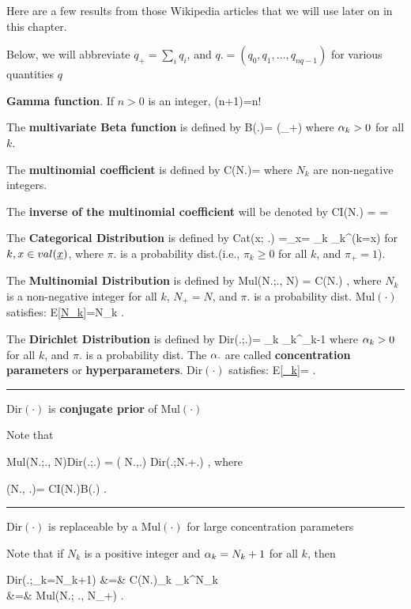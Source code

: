 Here are a few 
results 
from those Wikipedia
articles that we
will use later on
in this chapter.

Below,
we will abbreviate
$q_+=\sum_i q_i$, and
$q.=(q_0, q_1, \ldots, q_{nq-1})$
for various quantities $q$

{\bf Gamma function}. If $n>0$ is an integer,
\beq
\Gamma(n+1)=n!
\eeq

The {\bf multivariate Beta function} 
is defined by
\beq
B(\alp.)=
{\Gamma(\alp_+)}
\eeq
where $\alpha_k>0$ for all $k$.

The {\bf multinomial coefficient}
is defined by
\beq
C(N.)=
\eeq
where $N_k$ are non-negative
integers.

The {\bf inverse of the multinomial 
coefficient} will
be denoted by
\beq
CI(N.)
=
=
\eeq

The {\bf Categorical Distribution}
is defined by
\beq
Cat(x; \pi.)
=\pi_x=
\prod_{k} \pi_k^{\indi(k=x)}
\eeq
for $k, x\in val(\rvx)$,
where 
$\pi.$ is a
probability dist.(i.e., $\pi_k\geq 0$
for all $k$,
and $\pi_+=1$).



The {\bf Multinomial Distribution}
is defined by
\beq
Mul(N.;\pi., N)
=
C(N.)
\;,
\eeq
where $N_k$
is a non-negative
integer for all $k$,
$N_+=N$,
and $\pi.$
is a probability dist.
Mul$(\cdot)$ satisfies:
\beq
E[\ul{N_k}]=N\pi_k
\;.
\label{eq-exp-val-mul}
\eeq

The {\bf Dirichlet Distribution}
is defined by
\beq
Dir(\pi.;\alp.)=
\prod_k
\pi_k^{\alp_k-1}
\eeq
where $\alpha_k>0$
for all $k$,
and $\pi.$
is a probability dist.
The
$\alpha.$ are called 
{\bf concentration parameters}
or {\bf hyperparameters}.
Dir$(\cdot)$ satisfies:
\beq
E[\ul{\pi_k}]=
\;.
\label{eq-exp-val-dir}
\eeq


\hrule\noindent
Dir$(\cdot)$ is {\bf conjugate prior} of  Mul$(\cdot)$

Note that

\beq
Mul(N.;\pi., N)Dir(\pi.;\alp.)
=
\calk( N.,\alp.)
Dir(\pi.;N.+\alp.)
\;,
\eeq
where

\beq
\calk(N., \alp.)=
{CI(N.)B(\alp.)}
\;.
\eeq
\hrule\noindent
Dir$(\cdot)$ is replaceable by a Mul$(\cdot)$
for large concentration parameters

Note that if $N_k$ is a positive  integer
and
$\alpha_k=N_k+1$ for all $k$, then

\beqa 
Dir(\pi.;\alp_k=N_k+1)
&=&
C(N.)\prod_k \pi_k^{N_k}
\\
&=&
Mul(N.; \pi., N_+)
\;.
\eeqa


